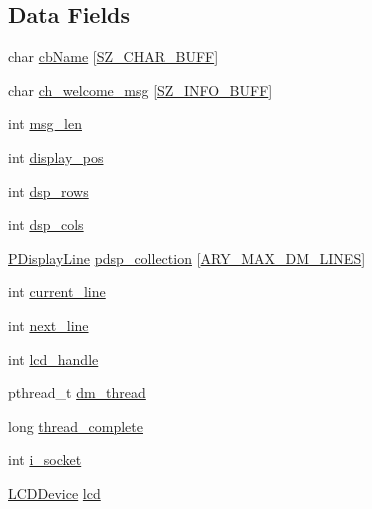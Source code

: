 \subsection*{Data Fields}
\begin{DoxyCompactItemize}
\item 
char \hyperlink{struct___d_i_s_p_l_a_y___m_a_n_a_g_e_r_abfad08e99f5f76d9e63de7d1fb88befd}{cb\+Name} \mbox{[}\hyperlink{skn__common__headers_8h_a8d2978ad614b0de81c60483e706d9306}{S\+Z\+\_\+\+C\+H\+A\+R\+\_\+\+B\+U\+FF}\mbox{]}
\item 
char \hyperlink{struct___d_i_s_p_l_a_y___m_a_n_a_g_e_r_a4ddfa233f1e3d41609f10b23a386541e}{ch\+\_\+welcome\+\_\+msg} \mbox{[}\hyperlink{skn__common__headers_8h_a442d5e93bd9c9d8eb4532aba62b5f86c}{S\+Z\+\_\+\+I\+N\+F\+O\+\_\+\+B\+U\+FF}\mbox{]}
\item 
int \hyperlink{struct___d_i_s_p_l_a_y___m_a_n_a_g_e_r_a10067d9a5974f5f19bf638ee72ddd973}{msg\+\_\+len}
\item 
int \hyperlink{struct___d_i_s_p_l_a_y___m_a_n_a_g_e_r_aa910f0f6b6ce599a8be02853214d860c}{display\+\_\+pos}
\item 
int \hyperlink{struct___d_i_s_p_l_a_y___m_a_n_a_g_e_r_aeddcffcc90a611efde00a085352bc63b}{dsp\+\_\+rows}
\item 
int \hyperlink{struct___d_i_s_p_l_a_y___m_a_n_a_g_e_r_a8ea0b9503de7da47f210489c8fa19867}{dsp\+\_\+cols}
\item 
\hyperlink{skn__common__headers_8h_a754e9456a497a668b8d959ed2cbe9ec3}{P\+Display\+Line} \hyperlink{struct___d_i_s_p_l_a_y___m_a_n_a_g_e_r_a3a5ccb906320bd6aecbf89cb6b0fc234}{pdsp\+\_\+collection} \mbox{[}\hyperlink{skn__common__headers_8h_a199b80b777af46c9141191749f8f026d}{A\+R\+Y\+\_\+\+M\+A\+X\+\_\+\+D\+M\+\_\+\+L\+I\+N\+ES}\mbox{]}
\item 
int \hyperlink{struct___d_i_s_p_l_a_y___m_a_n_a_g_e_r_aae8a6a90422fd9f571dff5f455740aa4}{current\+\_\+line}
\item 
int \hyperlink{struct___d_i_s_p_l_a_y___m_a_n_a_g_e_r_aed299ac3603bba3dfe3c09389122f8d8}{next\+\_\+line}
\item 
int \hyperlink{struct___d_i_s_p_l_a_y___m_a_n_a_g_e_r_a6ebc44b98c1483295586660829eb5a43}{lcd\+\_\+handle}
\item 
pthread\+\_\+t \hyperlink{struct___d_i_s_p_l_a_y___m_a_n_a_g_e_r_a7033f795cd887063d36c11556c368e6f}{dm\+\_\+thread}
\item 
long \hyperlink{struct___d_i_s_p_l_a_y___m_a_n_a_g_e_r_ae20e9cf0e6789ce07c5b8005b4a7ada0}{thread\+\_\+complete}
\item 
int \hyperlink{struct___d_i_s_p_l_a_y___m_a_n_a_g_e_r_a23e726562acd51d59c09eafa6f179137}{i\+\_\+socket}
\item 
\hyperlink{skn__common__headers_8h_a0f995b3ca5c58b83622b2faea0d21cb8}{L\+C\+D\+Device} \hyperlink{struct___d_i_s_p_l_a_y___m_a_n_a_g_e_r_a182e9fb6ca9f11b3e0a35628123d46f5}{lcd}
\end{DoxyCompactItemize}


